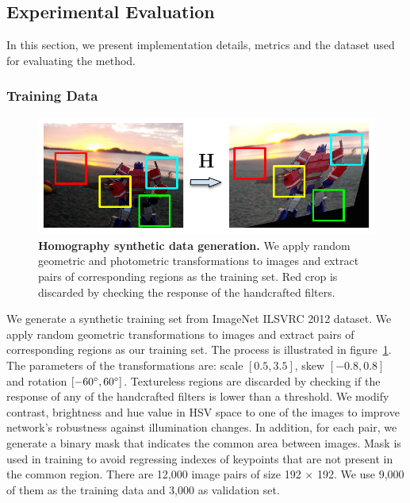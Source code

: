 \subsection{Experimental Evaluation}
\label{keynet_sec:experimental_evaluation}


In this section, we present implementation details, metrics and the dataset used for evaluating the method.

\subsubsection{Training Data}
\label{sec:create_dataset}

\begin{figure}[!tbh]
 \hspace*{-0.1cm} 
 \vspace{-0.4cm}
    \centering
    \includegraphics[scale=0.8]{main/chapter02/figures/dataset_v3.pdf}
    \vspace{-0.0cm}
    \caption[Homography synthetic data generation]{\textbf{Homography synthetic data generation.} We apply random geometric and photometric transformations to images and extract pairs of corresponding regions as the training set. Red crop is discarded by checking the response of the handcrafted filters.}
    \label{fig:dataset}
\end{figure}
We generate a synthetic training set from ImageNet ILSVRC 2012 \cite{RussakovskyDSKSMHKKBBF14} dataset. We apply random geometric transformations to images and extract pairs of corresponding regions as our training set. The process is illustrated in figure~\ref{fig:dataset}. The parameters of the transformations are: scale $[0.5, 3.5]$, skew  $[-0.8, 0.8]$ and rotation $[-60^\circ, 60^\circ]$. Textureless regions are discarded by checking if the response of any of the handcrafted filters is lower than a threshold. We modify contrast, brightness and hue value in HSV space to one of the images to improve network's robustness against illumination changes. In addition, for each pair, we generate a binary mask that indicates the common area between images. Mask is used in training to avoid regressing indexes of keypoints that are not present in the common region. There are 12,000 image pairs of size 192 $\times$ 192. We use 9,000 of them as the training data and 3,000 as validation set.

